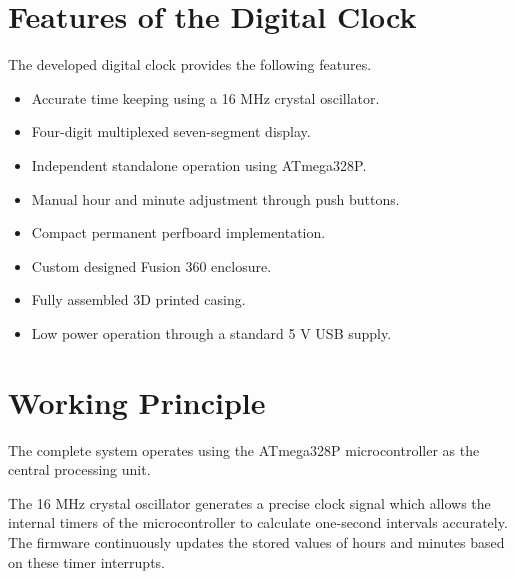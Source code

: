 \documentclass[12pt,a4paper]{article}
\begin{document}

\section{Features of the Digital Clock}

The developed digital clock provides the following features.

\begin{itemize}

\item Accurate time keeping using a 16 MHz crystal oscillator.

\item Four-digit multiplexed seven-segment display.

\item Independent standalone operation using ATmega328P.

\item Manual hour and minute adjustment through push buttons.

\item Compact permanent perfboard implementation.

\item Custom designed Fusion 360 enclosure.

\item Fully assembled 3D printed casing.

\item Low power operation through a standard 5 V USB supply.

\end{itemize}


\section{Working Principle}

The complete system operates using the ATmega328P microcontroller as the central processing unit.

The 16 MHz crystal oscillator generates a precise clock signal which allows the internal timers of the microcontroller to calculate one-second intervals accurately. The firmware continuously updates the stored values of hours and minutes based on these timer interrupts.
\end{document}
